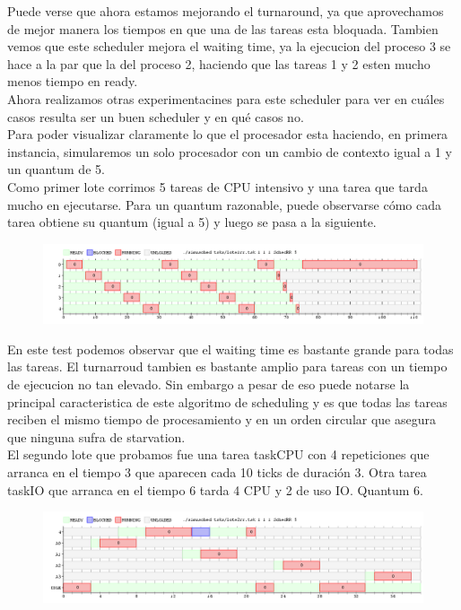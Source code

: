 Puede verse que ahora estamos mejorando el turnaround, ya que aprovechamos de mejor manera los tiempos en que una de las tareas esta bloquada. Tambien vemos que este scheduler mejora el waiting time, ya la ejecucion del proceso 3 se hace a la par que la del proceso 2, haciendo que las tareas 1 y 2 esten mucho menos tiempo en ready.
\\
Ahora realizamos otras experimentacines para este scheduler para ver en cuáles casos resulta ser un buen scheduler y en qué casos no.
\\
Para poder visualizar claramente lo que el procesador esta haciendo, en primera instancia, simularemos un solo procesador con un cambio de contexto igual a 1 y un quantum de 5.
\\
Como primer lote corrimos 5 tareas de CPU intensivo y una tarea que tarda mucho en ejecutarse. Para un quantum razonable, puede observarse cómo cada tarea obtiene su quantum (igual a 5) y luego se pasa a la siguiente.
\\
\begin{figure}[H]
  \centering
\includegraphics[scale=0.45]{graficos/parte2/rr/2.png}
  \caption[Caption for LOF]{}
\end{figure}
En este test podemos observar que el waiting time es bastante grande para todas las tareas. El turnarroud tambien es bastante amplio para tareas con un tiempo de ejecucion no tan elevado. Sin embargo a pesar de eso puede notarse la principal caracteristica de este algoritmo de scheduling y es que todas las tareas reciben el mismo tiempo de procesamiento y en un orden circular que asegura que ninguna sufra de starvation.
\\
El segundo lote que probamos fue una tarea taskCPU con 4 repeticiones que arranca en el tiempo 3 que aparecen cada 10 ticks de duración 3. Otra tarea taskIO que arranca en el tiempo 6 tarda 4 CPU y 2 de uso IO. Quantum 6.
\\
\begin{figure}[H]
  \centering
\includegraphics[scale=0.45]{graficos/parte2/rr/3.png}
  \caption[Caption for LOF]{}
\end{figure}

